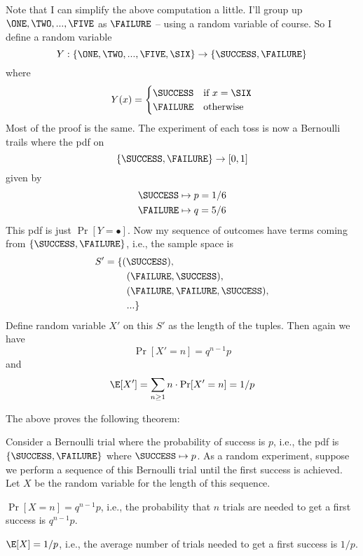 

Note that I can simplify the above computation a little.
I'll group up $\ONE, \TWO, ..., \FIVE$ as $\FAILURE$ -- using a random variable of course.
So I define a random variable 
\[
Y: \{\ONE, \TWO, ..., \FIVE, \SIX\} \rightarrow \{\SUCCESS, \FAILURE\}
\]
where
\[
Y(x) =
\begin{cases}
  \SUCCESS & \text{if } x = \SIX \\
  \FAILURE & \text{otherwise}
\end{cases}
\]  
Most of the proof is the same.
The experiment of each toss is now a Bernoulli trails where
the pdf on
\[
\{\SUCCESS, \FAILURE\} \rightarrow [0,1]
\]
given by
\begin{align*}
  \SUCCESS &\mapsto p = 1/6 \\
  \FAILURE &\mapsto q = 5/6
\end{align*}
This pdf is just $\Pr[Y = \bullet]$.
Now my sequence of outcomes have terms coming from $\{\SUCCESS, \FAILURE\}$, i.e.,
the sample space is
\begin{align*}
  S' &= \{(\SUCCESS), \\
  &\hspace{0.8cm} (\FAILURE, \SUCCESS), \\
  &\hspace{0.8cm} (\FAILURE, \FAILURE, \SUCCESS), \\
  &\hspace{0.8cm} ...\}
\end{align*}
Define random variable $X'$ on this $S'$ as the length of the tuples.
Then again we have
\[
\Pr[X' = n] = q^{n-1}p
\]
and
\[
\E[X'] = \sum_{n \geq 1} n \cdot \Pr[X' = n] = 1/p
\]

The above proves the following theorem:

\begin{prop}
  Consider a Bernoulli trial where the probability of success is $p$, i.e.,
  the pdf is $\{\SUCCESS, \FAILURE\}$ where $\SUCCESS \mapsto p$.
  As a random experiment, suppose we perform a sequence of this Bernoulli trial until
  the first success is achieved.
  Let $X$ be the random variable for the length of this sequence.
  \begin{myenum}
  \item
    $\Pr[X = n] = q^{n - 1}p$, i.e., 
    the probability that $n$ trials are needed to get a first success is $q^{n-1}p$. 
  \item
    $\E[X] = 1/p$, i.e., 
    the average number of trials needed to get a first success is $1/p$.
  \end{myenum}
\end{prop}
  


